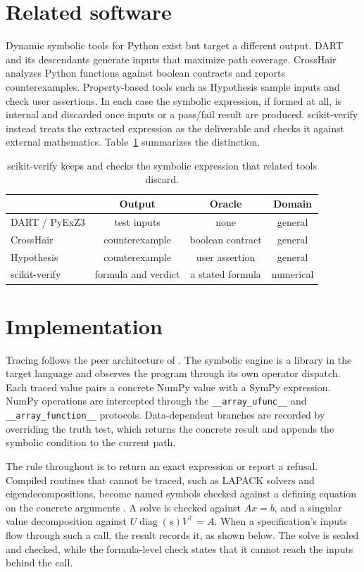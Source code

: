 \documentclass[twoside,11pt]{article}
\begin{document}
\section{Related software}

Dynamic symbolic tools for Python exist but target a different output.
DART \citep{godefroid2005} and its descendants generate inputs that
maximize path coverage. CrossHair analyzes Python functions against
boolean contracts and reports counterexamples. Property-based tools
such as Hypothesis sample inputs and check user assertions. In each
case the symbolic expression, if formed at all, is internal and
discarded once inputs or a pass/fail result are produced. scikit-verify
instead treats the extracted expression as the deliverable and checks
it against external mathematics. Table~\ref{tab:cmp} summarizes the
distinction.

\begin{table}[h]
\centering
\small
\begin{tabular}{lccc}
\toprule
 & Output & Oracle & Domain \\
\midrule
DART / PyExZ3 & test inputs & none & general \\
CrossHair & counterexample & boolean contract & general \\
Hypothesis & counterexample & user assertion & general \\
scikit-verify & formula and verdict & a stated formula & numerical \\
\bottomrule
\end{tabular}
\caption{scikit-verify keeps and checks the symbolic expression that
related tools discard.}
\label{tab:cmp}
\end{table}

\section{Implementation}

Tracing follows the peer architecture of \citet{bruni2011}. The
symbolic engine is a library in the target language and observes the
program through its own operator dispatch. Each traced value pairs a
concrete NumPy value with a SymPy expression. NumPy operations are
intercepted through the \verb|__array_ufunc__| and
\verb|__array_function__| protocols. Data-dependent branches are
recorded by overriding the truth test, which returns the concrete
result and appends the symbolic condition to the current path.

The rule throughout is to return an exact expression or report a
refusal. Compiled routines that cannot be traced, such as LAPACK
solvers and eigendecompositions, become named symbols checked against a
defining equation on the concrete arguments \citep{blum1989}. A solve is
checked against $Ax = b$, and a singular value decomposition against $U
\operatorname{diag}(s) V^\top = A$. When a specification's inputs flow
through such a call, the result records it, as shown below. The solve is
sealed and checked, while the formula-level check states that it cannot
reach the inputs behind the call.
\end{document}
